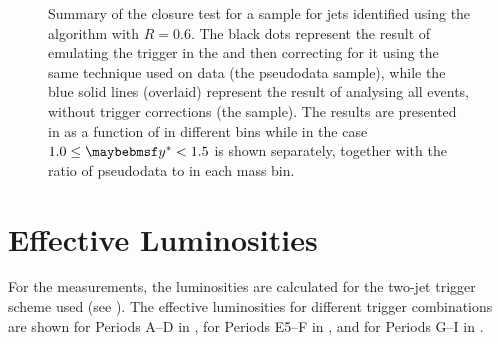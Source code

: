 \begin{figure}[htpb]
{    \label{fig:dijets:closure_ratio}}
  \caption{Summary of the closure test for a \dijet \MC sample for jets identified using the \akt algorithm with $R=0.6$. The black dots represent the result of emulating the trigger in the \MC and then correcting for it using the same technique used on data (the pseudodata sample), while the blue solid lines (overlaid) represent the result of analysing all events, without trigger corrections (the \MC sample). The results are presented in \protect{} as a function of \mDijet in different \yStar bins while in \protect{} the case $1.0 \leq \yStar < 1.5$ is shown separately, together with the ratio of pseudodata to \MC in each mass bin.}
  \label{fig:dijets:closure}
\end{figure}

\section{Effective Luminosities}
For the \dijet measurements, the luminosities are calculated for the two-jet trigger
scheme used (see ).
The effective luminosities for different trigger combinations
are shown for Periods A--D in , for Periods E5--F
in , and for Periods G--I in .

